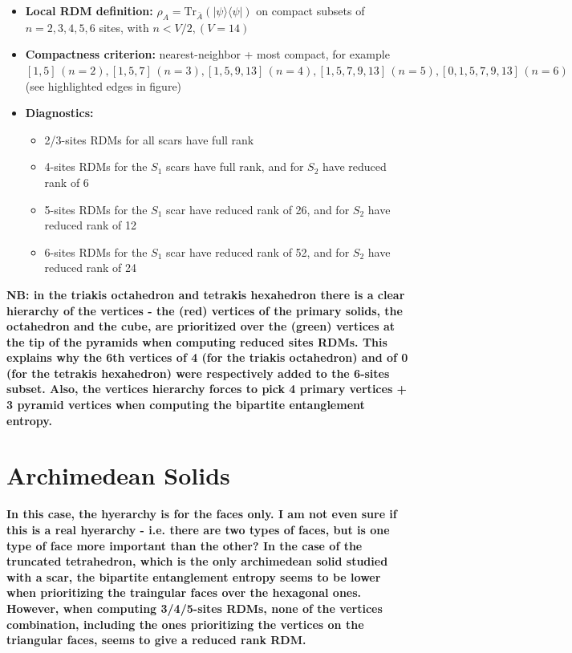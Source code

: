 \documentclass[11pt,a4paper]{article}
\begin{document}
\begin{itemize}[leftmargin=1.5em]
  \item \textbf{Local RDM definition:} $\rho_A=\mathrm{Tr}_{\bar A}(|\psi\rangle\langle\psi|)$ on compact subsets of $n=2,3,4,5,6$ sites, with $n < V/2, (V=14)$
  \item \textbf{Compactness criterion:} nearest-neighbor + most compact, for example $[1,5] \, (n = 2), [1,5,7] \, (n = 3), [1,5,9,13] \,  (n = 4), [1,5,7,9,13] \, (n = 5), [0,1,5,7,9,13] \, (n = 6)$ (see highlighted edges in figure)
  \item \textbf{Diagnostics:} \begin{itemize} \item 2/3-sites RDMs for all scars have full rank \item 4-sites RDMs for the $S_1$ scars have full rank, and for $S_2$ have reduced rank of 6  \item 5-sites RDMs for the $S_1$ scar have reduced rank of 26, and for $S_2$ have reduced rank of 12 \item 6-sites RDMs for the $S_1$ scar have reduced rank of 52, and for $S_2$ have reduced rank of 24 \end{itemize}
\end{itemize}



\noindent\textbf{NB: in the triakis octahedron and tetrakis hexahedron there is a clear hierarchy of the vertices - the (red) vertices of the primary solids, the octahedron and the cube, are prioritized over the (green) vertices at the tip of the pyramids when computing reduced sites RDMs. This explains why the 6th vertices of 4 (for the triakis octahedron) and of 0 (for the tetrakis hexahedron) were respectively added to the 6-sites subset. Also, the vertices hierarchy forces to pick 4 primary vertices + 3 pyramid vertices when computing the bipartite entanglement entropy.}

\section*{Archimedean Solids}

\noindent\textbf{In this case, the hyerarchy is for the faces only. I am not even sure if this is a real hyerarchy - i.e. there are two types of faces, but is one type of face more important than the other? In the case of the truncated tetrahedron, which is the only archimedean solid studied with a scar, the bipartite entanglement entropy seems to be lower when prioritizing the traingular faces over the hexagonal ones. However, when computing 3/4/5-sites RDMs, none of the vertices combination, including the ones prioritizing the vertices on the triangular faces, seems to give a reduced rank RDM.}
\end{document}

